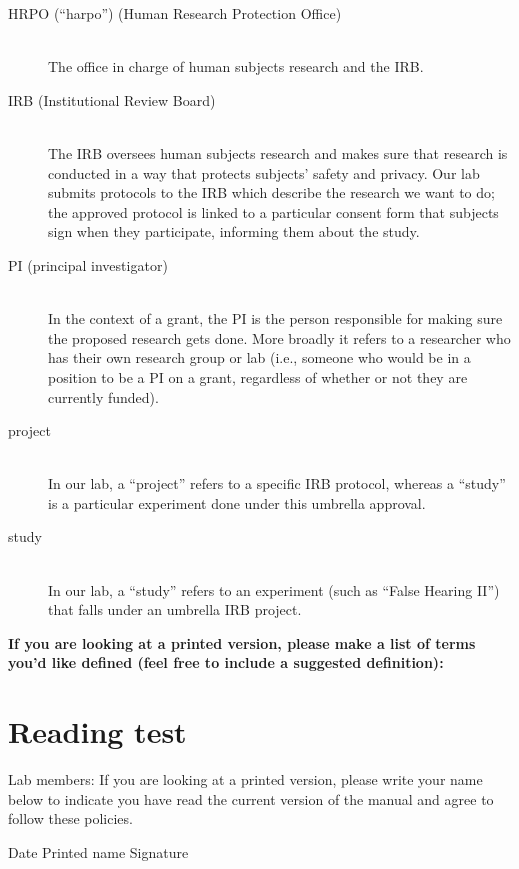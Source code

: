 \documentclass[letterpaper,12pt,oneside]{memoir}
\begin{document}
\begin{description}

\item[HRPO (``harpo'') (Human Research Protection Office)] \hfill \\
The office in charge of human subjects research and the IRB.

\item[IRB (Institutional Review Board)] \hfill \\
The IRB oversees human subjects research and makes sure that research is conducted in a way that protects subjects' safety and privacy. Our lab submits protocols to the IRB which describe the research we want to do; the approved protocol is linked to a particular consent form that subjects sign when they participate, informing them about the study.

\item[PI (principal investigator)] \hfill \\
In the context of a grant, the PI is the person responsible for making sure the proposed research gets done. More broadly it refers to a researcher who has their own research group or lab (i.e., someone who would be in a position to be a PI on a grant, regardless of whether or not they are currently funded).

\item[project] \hfill \\
In our lab, a ``project'' refers to a specific IRB protocol, whereas a ``study'' is a particular experiment done under this umbrella approval.

\item[study] \hfill \\
In our lab, a ``study'' refers to an experiment (such as ``False Hearing II'') that falls under an umbrella IRB project.

\end{description}

\vspace{.2in}
\noindent \textbf{\large If you are looking at a printed version, please make a list of terms you'd like defined (feel free to include a suggested definition):}



%
%

\chapter*{Reading test}
\noindent Lab members: If you are looking at a printed version, please write your name below to indicate you have read the current version of the manual and agree to follow these policies.

\vspace{,5in}

\noindent Date \hspace{.5in} Printed name \hspace{1.5in} Signature\\
\end{document}
